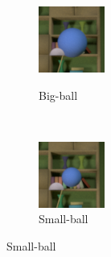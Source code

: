 \documentclass{jov}
\begin{document}
\begin{figure}
\centering
\begin{subfigure}[b]{0.14 \textwidth}
        \caption{Big-ball}
        \includegraphics[width=\textwidth]{../Figures/Figure4/Figure4_a.png}
        \label{fig:libraryWithBigBall}
    \end{subfigure}
    ~ 
\begin{subfigure}[b]{0.14 \textwidth}
        \caption{Small-ball}
        \includegraphics[width=\textwidth]{../Figures/Figure4/Figure4_b.png}

\end{subfigure}
\end{figure}
\end{document}
